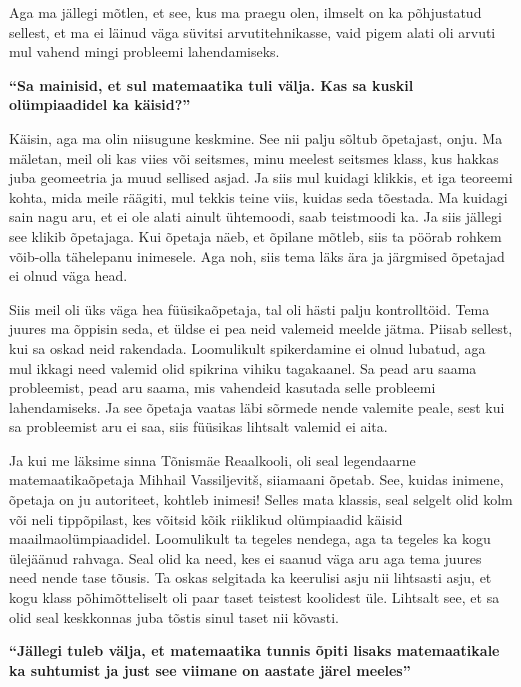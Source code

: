 Aga ma jällegi mõtlen, et see, kus ma praegu olen, ilmselt on  ka  
põhjustatud sellest, et ma ei läinud väga süvitsi  arvutitehnikasse, vaid pigem 
alati oli arvuti mul  vahend mingi probleemi lahendamiseks.

\textbf{\enquote{Sa mainisid, et sul matemaatika tuli välja. Kas sa kuskil 
olümpiaadidel ka käisid?}}

Käisin, aga ma olin niisugune keskmine. See nii palju sõltub õpetajast, onju. 
Ma mäletan, meil oli kas viies või seitsmes, minu meelest 
seitsmes klass, kus hakkas juba geomeetria ja muud sellised asjad. Ja siis mul 
kuidagi klikkis, et iga teoreemi kohta, mida meile räägiti, mul tekkis teine 
viis, kuidas seda tõestada. Ma kuidagi sain nagu aru, et ei ole alati ainult 
ühtemoodi, saab teistmoodi ka. Ja siis jällegi see klikib õpetajaga. Kui 
õpetaja näeb, et õpilane mõtleb, siis ta pöörab rohkem võib-olla tähelepanu 
inimesele. Aga noh, siis tema läks ära ja järgmised õpetajad ei olnud väga head.

Siis meil oli üks väga hea füüsikaõpetaja, tal oli hästi palju kontrolltöid. 
Tema juures ma õppisin seda, et üldse ei pea neid valemeid meelde jätma. Piisab 
sellest, kui sa oskad neid rakendada. Loomulikult spikerdamine ei olnud 
lubatud, aga mul ikkagi need valemid olid spikrina vihiku tagakaanel. Sa pead 
aru saama probleemist, pead aru saama, mis vahendeid kasutada selle probleemi 
lahendamiseks. Ja see õpetaja vaatas läbi sõrmede nende valemite peale, sest 
kui sa  probleemist aru ei saa, siis füüsikas lihtsalt valemid ei aita. 

Ja kui me läksime sinna Tõnismäe Reaalkooli, oli seal legendaarne 
matemaatikaõpetaja Mihhail Vassiljevitš, 
siiamaani õpetab. See, kuidas inimene, õpetaja on ju autoriteet, kohtleb 
inimesi! Selles mata klassis, seal selgelt olid kolm või neli  tippõpilast, kes 
võitsid kõik riiklikud olümpiaadid  käisid maailmaolümpiaadidel. Loomulikult ta 
tegeles nendega, aga ta tegeles ka kogu ülejäänud rahvaga. Seal olid ka need, 
kes ei saanud väga aru aga tema juures need nende tase tõusis. Ta oskas 
selgitada ka keerulisi asju nii lihtsasti asju, et kogu klass  põhimõtteliselt 
oli paar taset teistest koolidest üle. Lihtsalt see, et sa olid seal  
keskkonnas juba tõstis sinul taset nii kõvasti.


\textbf{\enquote{Jällegi tuleb välja, et matemaatika tunnis õpiti lisaks 
matemaatikale ka suhtumist ja just see viimane on aastate järel meeles}}

